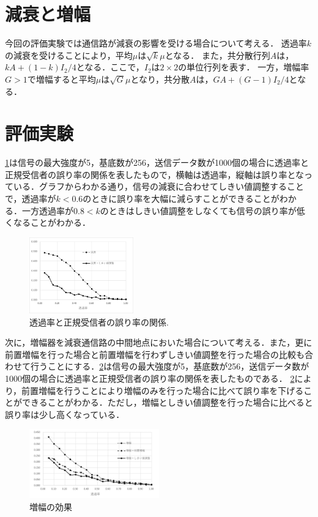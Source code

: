 \documentclass[a4j,twocolumn]{jarticle}
\def \figref #1{\figurename\ref{#1}}
\begin{document}
\section{減衰と増幅}
今回の評価実験では通信路が減衰の影響を受ける場合について考える．
透過率$k$の減衰を受けることにより，平均$\mu$は$\sqrt{k}\mu$となる．
また，共分散行列$A$は，$kA+ (1-k)I_2/4$となる．ここで，$I_2$は$2\times 2$の単位行列を表す．
一方，増幅率$G>1$で増幅すると平均$\mu$は$\sqrt{G}\mu$となり，共分散$A$は，$GA+(G-1)I_2/4$となる．


\section{評価実験}


\figref{Fig:5_4}は信号の最大強度が5，基底数が256，送信データ数が1000個の場合に透過率と正規受信者の誤り率の関係を表したもので，横軸は透過率，縦軸は誤り率となっている．グラフからわかる通り，信号の減衰に合わせてしきい値調整することで，透過率が$k<0.6$のときに誤り率を大幅に減らすことができることがわかる．一方透過率が$0.8<k$のときはしきい値調整をしなくても信号の誤り率が低くなることがわかる．

  
\begin{figure}[htbp]
        \centering   \includegraphics[width=0.4\textwidth]{img/zemi41.png}
        \caption[sample image (png)]{透過率と正規受信者の誤り率の関係.}
        \label{Fig:5_4}
    \end{figure}


次に，増幅器を減衰通信路の中間地点においた場合について考える．また，更に前置増幅を行った場合と前置増幅を行わずしきい値調整を行った場合の比較も合わせて行うことにする．\figref{Fig:5_5}は信号の最大強度が5，基底数が256，送信データ数が1000個の場合に透過率と正規受信者の誤り率の関係を表したものである．
\figref{Fig:5_5}により，前置増幅を行うことにより増幅のみを行った場合に比べて誤り率を下げることができることがわかる．ただし，増幅としきい値調整を行った場合に比べると誤り率は少し高くなっている．

\begin{figure}[htbp]
        \centering   
        \includegraphics[width=0.5\textwidth]{img/zemi40.png}
        \caption[sample image (png)]{増幅の効果}
        \label{Fig:5_5}
    \end{figure}
    
\end{document}
